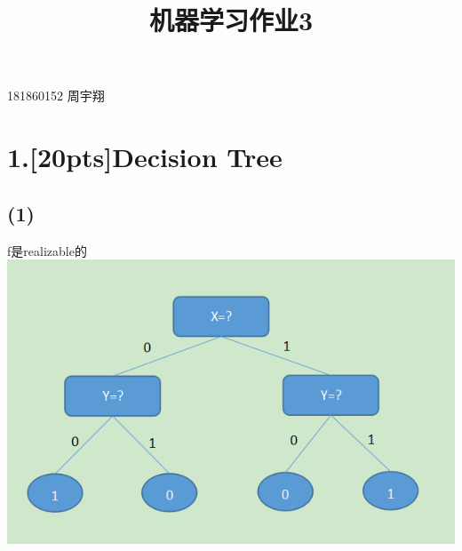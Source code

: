 \documentclass{article}
\title{机器学习作业3}
\begin{document}
\maketitle
\begin{center}
181860152 周宇翔
\end{center}
\section*{1.[20pts]Decision Tree}\noindent
\subsection*{(1)}\noindent
f是realizable的\\
\includegraphics[scale=0.5]{tree.png}
\end{document}
